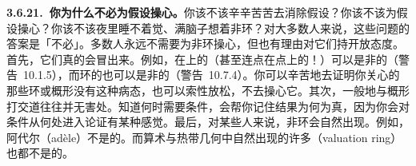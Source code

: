 \textbf{3.6.21.\ 你为什么不必为\trNoetherian{}假设操心。}\quad 你该不该辛辛苦苦去消除\trNoetherian{}假设？你该不该为\trNoetherian{}假设操心？你该不该夜里睡不着觉、满脑子想着非\trNoetherian{}环？对大多数人来说，这些问题的答案是「不必」。多数人永远不需要为非\trNoetherian{}环操心，但也有理由对它们持开放态度。首先，它们真的会冒出来。例如，\trNoetherian{}\trScheme{}在\trNoetherian{}\trScheme{}上的\trFiberProduct（甚至连\trNoetherian{}点在\trNoetherian{}点上的\trFiberProduct！）可以是非\trNoetherian{}的（警告~10.1.5），而\trNoetherian{}环的\trNormalization{}也可以是非\trNoetherian{}的（警告~10.7.4）。你可以辛苦地去证明你关心的那些环或概形没有这种病态，也可以索性放松，不去操心它。其次，一般地与概形打交道往往并无害处。知道何时需要\trNoetherian{}条件，会帮你记住结果为何为真，因为你会对\trNoetherian{}条件从何处进入论证有某种感觉。最后，对某些人来说，非\trNoetherian{}环会自然出现。例如，阿代尔（ad\`ele）不是\trNoetherian{}的。而算术与热带几何中自然出现的许多\trValuationRing{}（valuation ring）也都不是\trNoetherian{}的。
